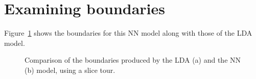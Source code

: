\documentclass[
  letterpaper,
]{krantz}
\begin{document}
\section{Examining boundaries}\label{examining-boundaries}

Figure~\ref{fig-penguins-lda-nn} shows the boundaries for this NN model
along with those of the LDA model.

\begin{figure}

\begin{minipage}{0.50\linewidth}



\end{minipage}%
%
\begin{minipage}{0.50\linewidth}



\end{minipage}%

\caption{\label{fig-penguins-lda-nn}Comparison of the boundaries
produced by the LDA (a) and the NN (b) model, using a slice tour.}

\end{figure}%
\end{document}
